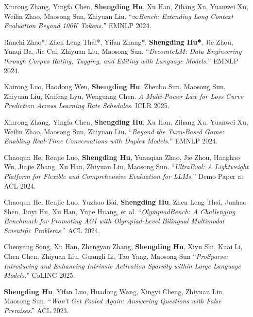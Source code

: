 \begin{resume}
\begin{achievements}
      \item Xinrong Zhang, Yingfa Chen, \textbf{Shengding Hu}, Xu Han, Zihang Xu, Yuanwei Xu, Weilin Zhao, Maosong Sun, Zhiyuan Liu. ``\textit{$\infty$Bench: Extending Long Context Evaluation Beyond 100K Tokens.'}' EMNLP 2024.
      
      \item Ranchi Zhao*, Zhen Leng Thai*, Yifan Zhang*, \textbf{Shengding Hu*}, Jie Zhou, Yunqi Ba, Jie Cai, Zhiyuan Liu, Maosong Sun. ``\textit{DecorateLM: Data Engineering through Corpus Rating, Tagging, and Editing with Language Models.}''  EMNLP 2024.
      
      \item Kairong Luo, Haodong Wen, \textbf{Shengding Hu}, Zhenbo Sun, Maosong Sun, Zhiyuan Liu, Kaifeng Lyu, Wenguang Chen. \textit{A Multi-Power Law for Loss Curve Prediction Across Learning Rate Schedules.} ICLR 2025.

      \item Xinrong Zhang, Yingfa Chen, \textbf{Shengding Hu}, Xu Han, Zihang Xu, Yuanwei Xu, Weilin Zhao, Maosong Sun, Zhiyuan Liu. ``\textit{Beyond the Turn-Based Game: Enabling Real-Time Conversations with Duplex Models.}'' EMNLP 2024. 
      
      \item Chaoqun He, Renjie Luo, \textbf{Shengding Hu}, Yuanqian Zhao, Jie Zhou, Hanghao Wu, Jiajie Zhang, Xu Han, Zhiyuan Liu, Maosong Sun. ``\textit{UltraEval: A Lightweight Platform for Flexible and Comprehensive Evaluation for LLMs.}'' Demo Paper at ACL 2024.
      
      \item Chaoqun He, Renjie Luo, Yuzhuo Bai, \textbf{Shengding Hu}, Zhen Leng Thai, Junhao Shen, Jinyi Hu, Xu Han, Yujie Huang, et al. ``\textit{OlympiadBench: A Challenging Benchmark for Promoting AGI with Olympiad-Level Bilingual Multimodal Scientific Problems.'}' ACL 2024.
      
      \item Chenyang Song, Xu Han, Zhengyan Zhang, \textbf{Shengding Hu}, Xiyu Shi, Kuai Li, Chen Chen, Zhiyuan Liu, Guangli Li, Tao Yang, Maosong Sun  ``\textit{ProSparse: Introducing and Enhancing Intrinsic Activation Sparsity within Large Language Models.}'' CoLING 2025.
      
      
        \item \textbf{Shengding Hu}, Yifan Luo, Huadong Wang, Xingyi Cheng, Zhiyuan Liu, Maosong Sun. ``\textit{Won't Get Fooled Again: Answering Questions with False Premises}.'' ACL 2023.
        

\end{achievements}
\end{resume}
